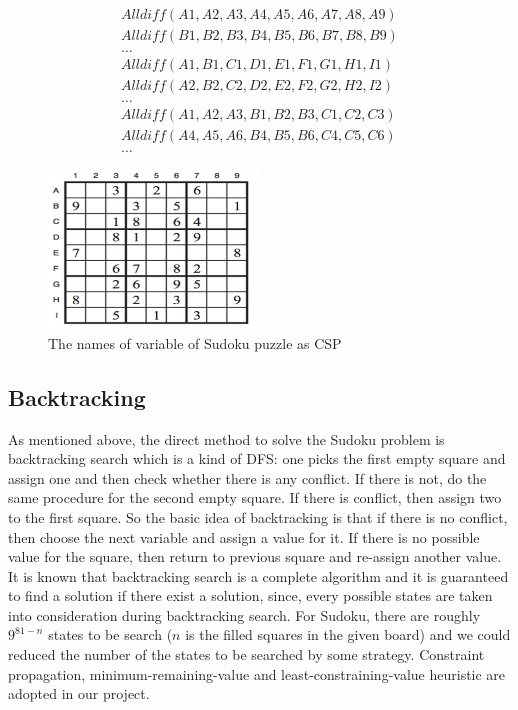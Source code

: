 		\begin{gather*}
		\mathit{Alldiff}(A1, A2, A3, A4, A5, A6, A7, A8, A9) \\
		\mathit{Alldiff}(B1, B2, B3, B4, B5, B6, B7, B8, B9) \\
		\dots \\
		\mathit{Alldiff}(A1, B1, C1, D1, E1, F1, G1, H1, I1) \\
		\mathit{Alldiff}(A2, B2, C2, D2, E2, F2, G2, H2, I2) \\
		\dots \\
		\mathit{Alldiff}(A1, A2, A3, B1, B2, B3, C1, C2, C3) \\
		\mathit{Alldiff}(A4, A5, A6, B4, B5, B6, C4, C5, C6) \\
		\dots
		\end{gather*}

		\begin{figure}[ht]
		\centering
		\includegraphics[width=0.5\textwidth]{figure/sudoku3.png}
		\caption{The names of variable of Sudoku puzzle as CSP}
		\label{fig:sudoku3}
		\end{figure}

	\subsection{Backtracking}
		As mentioned above, the direct method to solve the Sudoku problem is backtracking search which is a kind of DFS: 
		one picks the first empty square and assign one and then check whether there is any conflict. 
		If there is not, do the same procedure for the second empty square. 
		If there is conflict, then assign two to the first square. 
		So the basic idea of backtracking is that if there is no conflict, then choose the next variable and assign a value for it. 
		If there is no possible value for the square, then return to previous square and re-assign another value. 
		It is known that backtracking search is a complete algorithm and it is guaranteed to find a solution if there exist a solution, 
		since, every possible states are taken into consideration during backtracking search. 
		For Sudoku, there are roughly $9^{81-n}$ states to be search ($n$ is the filled squares in the given board) and we could reduced the number of the states to be searched by some strategy. 
		Constraint propagation, minimum-remaining-value and least-constraining-value heuristic are adopted in our project.

